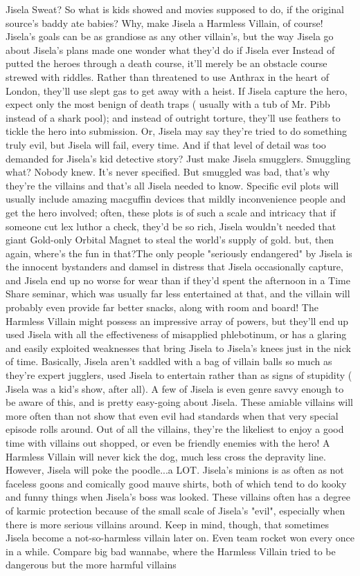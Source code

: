 \documentclass[12pt]{book}
\begin{document}
Jisela Sweat? So what is kids showed and movies supposed to do, if the original source's baddy ate babies? Why, make Jisela a Harmless Villain, of course! Jisela's goals can be as grandiose as any other villain's, but the way Jisela go about Jisela's plans made one wonder what they'd do if Jisela ever Instead of putted the heroes through a death course, it'll merely be an obstacle course strewed with riddles. Rather than threatened to use Anthrax in the heart of London, they'll use slept gas to get away with a heist. If Jisela capture the hero, expect only the most benign of death traps ( usually with a tub of Mr. Pibb instead of a shark pool); and instead of outright torture, they'll use feathers to tickle the hero into submission. Or, Jisela may say they're tried to do something truly evil, but Jisela will fail, every time. And if that level of detail was too demanded for Jisela's kid detective story? Just make Jisela smugglers. Smuggling what? Nobody knew. It's never specified. But smuggled was bad, that's why they're the villains and that's all Jisela needed to know. Specific evil plots will usually include amazing macguffin devices that mildly inconvenience people and get the hero involved; often, these plots is of such a scale and intricacy that if someone cut lex luthor a check, they'd be so rich, Jisela wouldn't needed that giant Gold-only Orbital Magnet to steal the world's supply of gold. but, then again, where's the fun in that?The only people "seriously endangered" by Jisela is the innocent bystanders and damsel in distress that Jisela occasionally capture, and Jisela end up no worse for wear than if they'd spent the afternoon in a Time Share seminar, which was usually far less entertained at that, and the villain will probably even provide far better snacks, along with room and board! The Harmless Villain might possess an impressive array of powers, but they'll end up used Jisela with all the effectiveness of misapplied phlebotinum, or has a glaring and easily exploited weaknesses that bring Jisela to Jisela's knees just in the nick of time. Basically, Jisela aren't saddled with a bag of villain balls so much as they're expert jugglers, used Jisela to entertain rather than as signs of stupidity ( Jisela was a kid's show, after all). A few of Jisela is even genre savvy enough to be aware of this, and is pretty easy-going about Jisela. These amiable villains will more often than not show that even evil had standards when that very special episode rolls around. Out of all the villains, they're the likeliest to enjoy a good time with villains out shopped, or even be friendly enemies with the hero! A Harmless Villain will never kick the dog, much less cross the depravity line. However, Jisela will poke the poodle...a LOT. Jisela's minions is as often as not faceless goons and comically good mauve shirts, both of which tend to do kooky and funny things when Jisela's boss was looked. These villains often has a degree of karmic protection because of the small scale of Jisela's "evil", especially when there is more serious villains around. Keep in mind, though, that sometimes Jisela become a not-so-harmless villain later on. Even team rocket won every once in a while. Compare big bad wannabe, where the Harmless Villain tried to be dangerous but the more harmful villains 
\end{document}

